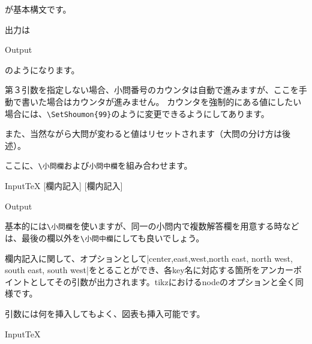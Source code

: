 \documentclass[luatex,fontsize=8pt,paper=b5,twoside]{jlreq}%
\begin{document}
\noindent が基本構文です。

出力は

\begin{OutPut}{Output}
\end{OutPut}

\noindent のようになります。

第３引数を指定しない場合、小問番号のカウンタは自動で進みますが、ここを手動で書いた場合はカウンタが進みません。
カウンタを強制的にある値にしたい場合には、\verb|\SetShoumon{99}|のように変更できるようにしてあります。

また、当然ながら大問が変わると値はリセットされます（大問の分け方は後述）。

ここに、\verb|\小問欄|および\verb|小問中欄|を組み合わせます。

\begin{SourceCode}{Input}{TeX}
  [欄内記入]
  [欄内記入]

\end{SourceCode}

\begin{OutPut}{Output}
\end{OutPut}

基本的には\verb|\小問欄|を使いますが、同一の小問内で複数解答欄を用意する時などは、最後の欄以外を\verb|\小問中欄|にしても良いでしょう。

欄内記入に関して、オプションとして\KKverb|center,east,west,north east, north west, south east, south west|をとることができ、各key名に対応する箇所をアンカーポイントとしてその引数が出力されます。tikzにおけるnodeのオプションと全く同様です。

引数には何を挿入してもよく、図表も挿入可能です。

\begin{SourceCode}{Input}{TeX}
\end{SourceCode}
\end{document}
